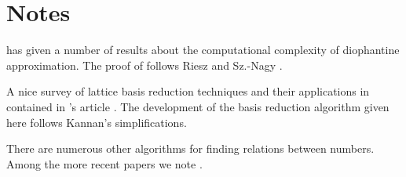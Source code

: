 \section*{Notes}

\small

{\Lagarias} \cite{Lagarias85a} has given a number of results
about the computational complexity of diophantine approximation.
The proof of  follows Riesz and Sz.-Nagy
\cite{Riesz:Sz-Nagy}. 

 A nice survey of lattice basis
reduction techniques and their applications in contained in \Kannan's
article \cite{Kannan87}.  The development of the basis reduction
algorithm given here follows Kannan's simplifications.

  There are numerous other algorithms
for finding relations between numbers.  Among the more recent papers
we note \cite{Bailey89,Kannan86,Hastad89}.

\normalsize
